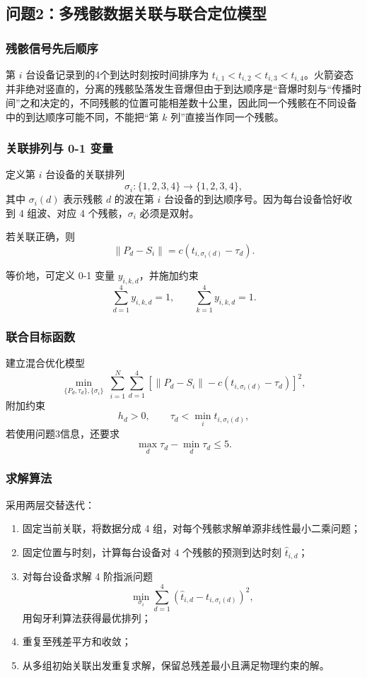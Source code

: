 \documentclass[12pt,a4paper]{article}
\begin{document}
\subsection{问题2：多残骸数据关联与联合定位模型}

\subsubsection{残骸信号先后顺序}

第 $i$ 台设备记录到的4个到达时刻按时间排序为 $t_{i,1}<t_{i,2}<t_{i,3}<t_{i,4}$。火箭姿态并非绝对竖直的，分离的残骸坠落发生音爆但由于到达顺序是“音爆时刻与“传播时间”之和决定的，不同残骸的位置可能相差数十公里，因此同一个残骸在不同设备中的到达顺序可能不同，不能把“第 $k$ 列”直接当作同一个残骸。

\subsubsection{关联排列与 0-1 变量}

定义第 $i$ 台设备的关联排列
\[
\sigma_i:\{1,2,3,4\}\to\{1,2,3,4\},
\]
其中 $\sigma_i(d)$ 表示残骸 $d$ 的波在第 $i$ 台设备的到达顺序号。因为每台设备恰好收到 4 组波、对应 4 个残骸，$\sigma_i$ 必须是双射。

若关联正确，则
\[
\|P_d-S_i\|=c\left(t_{i,\sigma_i(d)}-\tau_d\right).
\]

等价地，可定义 0-1 变量 $y_{i,k,d}$，并施加约束
\[
\sum_{d=1}^{4}y_{i,k,d}=1,\qquad
\sum_{k=1}^{4}y_{i,k,d}=1.
\]

\subsubsection{联合目标函数}

建立混合优化模型
\[
\min_{\{P_d,\tau_d\},\{\sigma_i\}}\ 
\sum_{i=1}^{N}\sum_{d=1}^{4}
\left[
\|P_d-S_i\|-c\left(t_{i,\sigma_i(d)}-\tau_d\right)
\right]^2,
\]
附加约束
\[
h_d>0,\qquad \tau_d<\min_i t_{i,\sigma_i(d)},
\]
若使用问题3信息，还要求
\[
\max_{d}\tau_d-\min_{d}\tau_d\le 5.
\]

\subsubsection{求解算法}

采用两层交替迭代：

\begin{enumerate}[label=\arabic*.]
  \item 固定当前关联，将数据分成 4 组，对每个残骸求解单源非线性最小二乘问题；
  \item 固定位置与时刻，计算每台设备对 4 个残骸的预测到达时刻 $\hat t_{i,d}$；
  \item 对每台设备求解 4 阶指派问题
  \[
  \min_{\sigma_i}\sum_{d=1}^{4}\left(\hat t_{i,d}-t_{i,\sigma_i(d)}\right)^2,
  \]
  用匈牙利算法获得最优排列；
  \item 重复至残差平方和收敛；
  \item 从多组初始关联出发重复求解，保留总残差最小且满足物理约束的解。
\end{enumerate}
\end{document}
